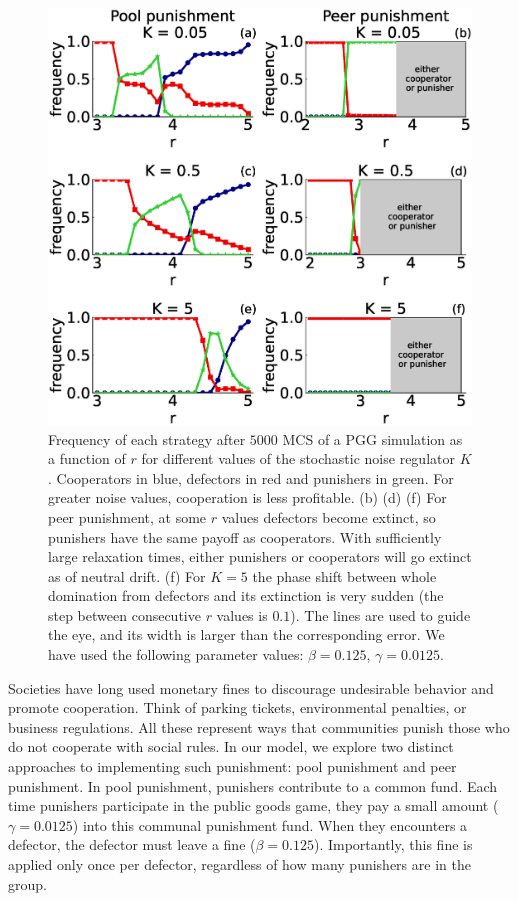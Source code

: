 \begin{figure}
	\centering
	\includegraphics[width=1\linewidth]{Images/P2/densidadVSr_L300t5000variosK.eps}
	\caption{Frequency of each strategy after $5000$ MCS of a PGG simulation as a function of $r$ for different values of the stochastic noise regulator $K$. Cooperators in blue, defectors in red and punishers in green. For greater noise values, cooperation is less profitable. (b) (d) (f) For peer punishment, at some $r$ values defectors become extinct, so  punishers have the same payoff as cooperators. With sufficiently large relaxation times, either punishers or cooperators will go extinct as of neutral drift. (f) For $K=5$ the phase shift between whole domination from defectors and its extinction is very sudden (the step between consecutive $r$ values is $0.1$). The lines are used to guide the eye, and its width is larger than the corresponding error. We have used the following parameter values: $\beta=0.125$, $\gamma=0.0125$.}
	\label{densidad}
\end{figure}




Societies have long used monetary fines to discourage undesirable behavior and promote cooperation. Think of parking tickets, environmental penalties, or business regulations. All these represent ways that communities punish those who do not cooperate with social rules. In our model, we explore two distinct approaches to implementing such punishment: pool punishment and peer punishment. 
In pool punishment, punishers contribute to a common fund. Each time punishers participate in the public goods game, they pay a small amount ($\gamma=0.0125$) into this communal punishment fund. When they encounters a defector, the defector must leave a fine ($\beta=0.125$). Importantly, this fine is applied only once per defector, regardless of how many punishers are in the group.

